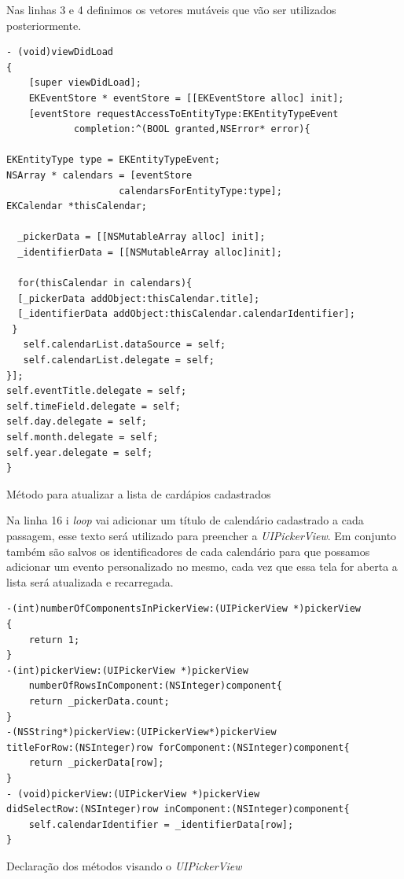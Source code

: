 \documentclass[a4paper,12pt,brazil,doubleside]{book}
\begin{document}
\begin{singlespace}
Nas linhas 3 e 4 definimos os vetores mutáveis que vão ser utilizados posteriormente.

\begin{listing}[H]
\begin{verbatim}
- (void)viewDidLoad
{
    [super viewDidLoad];
    EKEventStore * eventStore = [[EKEventStore alloc] init];
    [eventStore requestAccessToEntityType:EKEntityTypeEvent 
    		completion:^(BOOL granted,NSError* error){
        
EKEntityType type = EKEntityTypeEvent;
NSArray * calendars = [eventStore 
        			calendarsForEntityType:type];
EKCalendar *thisCalendar;
      
  _pickerData = [[NSMutableArray alloc] init];
  _identifierData = [[NSMutableArray alloc]init];
       
  for(thisCalendar in calendars){
  [_pickerData addObject:thisCalendar.title];
  [_identifierData addObject:thisCalendar.calendarIdentifier];
 }
   self.calendarList.dataSource = self;
   self.calendarList.delegate = self;
}];
self.eventTitle.delegate = self;
self.timeField.delegate = self;
self.day.delegate = self;
self.month.delegate = self;
self.year.delegate = self;
}
\end{verbatim}
\caption{Método para atualizar a lista de cardápios cadastrados}
\end{listing}

Na linha 16 i \emph{loop} vai adicionar um título de calendário cadastrado a cada passagem, esse texto será utilizado para preencher a \emph{UIPickerView}. Em conjunto também são salvos os identificadores de cada calendário para que possamos adicionar um evento personalizado no mesmo, cada vez que essa tela for aberta a lista será atualizada e recarregada.

\begin{listing}[H]
\begin{verbatim}
-(int)numberOfComponentsInPickerView:(UIPickerView *)pickerView
{
    return 1;
}
-(int)pickerView:(UIPickerView *)pickerView 
	numberOfRowsInComponent:(NSInteger)component{
    return _pickerData.count;
}
-(NSString*)pickerView:(UIPickerView*)pickerView 
titleForRow:(NSInteger)row forComponent:(NSInteger)component{
    return _pickerData[row];
}
- (void)pickerView:(UIPickerView *)pickerView 
didSelectRow:(NSInteger)row inComponent:(NSInteger)component{
    self.calendarIdentifier = _identifierData[row];
}
\end{verbatim}
\caption{Declaração dos métodos visando o \emph{UIPickerView}}
\end{listing}


\end{singlespace}
\end{document}
